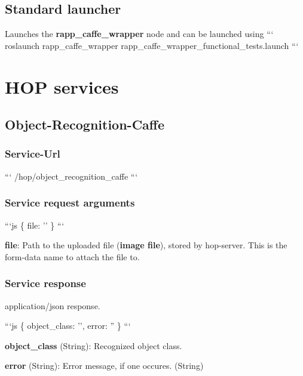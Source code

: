 \subsection*{Standard launcher}

Launches the {\bfseries rapp\-\_\-caffe\-\_\-wrapper} node and can be launched using ``` roslaunch rapp\-\_\-caffe\-\_\-wrapper rapp\-\_\-caffe\-\_\-wrapper\-\_\-functional\-\_\-tests.\-launch ```

\section*{H\-O\-P services}

\subsection*{Object-\/\-Recognition-\/\-Caffe}

\subsubsection*{Service-\/\-Url}

``` /hop/object\-\_\-recognition\-\_\-caffe ```

\subsubsection*{Service request arguments}

```js \{ file\-: '' \} ```


\begin{DoxyItemize}
\item {\bfseries file}\-: Path to the uploaded file ({\bfseries image file}), stored by hop-\/server. This is the form-\/data name to attach the file to.
\end{DoxyItemize}

\subsubsection*{Service response}

application/json response.

```js \{ object\-\_\-class\-: '', error\-: '' \} ```


\begin{DoxyItemize}
\item {\bfseries object\-\_\-class} (String)\-: Recognized object class.
\item {\bfseries error} (String)\-: Error message, if one occures. (String) 
\end{DoxyItemize}